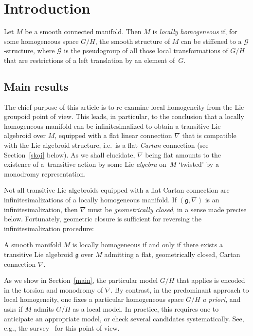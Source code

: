 \section{Introduction}
Let $M$ be a smooth connected manifold. Then $M$ is {\it locally
  homogeneous} if, for some homogeneous space $G/H$, the smooth
structure of $M$ can be stif\/fened to a ${\mathcal G}$-structure, where
${\mathcal G}$ is the pseudogroup of all those local transformations
of $G/H$ that are restrictions of a left translation by an element of~$G$.

\subsection{Main results}\label{goose}%
The chief purpose of this article is to re-examine local homogeneity
from the Lie groupoid point of view. This leads, in particular, to the
conclusion that a locally homogeneous manifold can be
inf\/initesimalized to obtain a transitive Lie algebroid over $M$,
equipped with a f\/lat linear connection $\nabla$ that is compatible
with the Lie algebroid structure, i.e.\ is a f\/lat {\it Cartan}
connection (see Section~\ref{skoj} below). As we shall elucidate, $\nabla$
being f\/lat amounts to the existence of a~transitive action by some Lie
{\em algebra} on~$M$ `twisted' by a monodromy representation.

Not all transitive Lie algebroids equipped with a f\/lat Cartan
connection are inf\/initesimali\-za\-tions of a locally homogeneous
manifold. If $({\mathfrak g}, \nabla)$ is an inf\/initesimalization,
then $\nabla $ must be {\it geometrically closed}, in a sense made
precise below. Fortunately, geometric closure is suf\/f\/icient for
reversing the inf\/initesimalization procedure:

\begin{TheoremBlaom}\label{TheoremA}
  A smooth manifold $M$ is locally homogeneous if and only if there
  exists a transitive Lie algebroid $\mathfrak g$ over $M$ admitting a
  flat, geometrically closed, Cartan connection $\nabla$.
\end{TheoremBlaom}


As we show in Section~\ref{main}, the particular model $G/H$ that applies is
encoded in the torsion and monodromy of $\nabla$. By contrast, in the
predominant approach to local homogeneity, one f\/ixes a particular
homogeneous space $G/H$ {\em a priori}, and asks if $M$ admits $G/H$
as a local model. In practice, this requires one to anticipate an
appropriate model, or check several candidates systematically. See,
e.g., the survey~\cite{Goldman_10} for this point of view.

